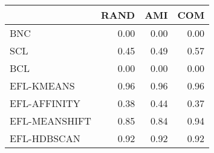 \begin{tabular}{lrrr}
\toprule
 & RAND & AMI & COM \\
\midrule
BNC & 0.00 & 0.00 & 0.00 \\
SCL & 0.45 & 0.49 & 0.57 \\
BCL & 0.00 & 0.00 & 0.00 \\
EFL-KMEANS & 0.96 & 0.96 & 0.96 \\
EFL-AFFINITY & 0.38 & 0.44 & 0.37 \\
EFL-MEANSHIFT & 0.85 & 0.84 & 0.94 \\
EFL-HDBSCAN & 0.92 & 0.92 & 0.92 \\
\bottomrule
\end{tabular}
